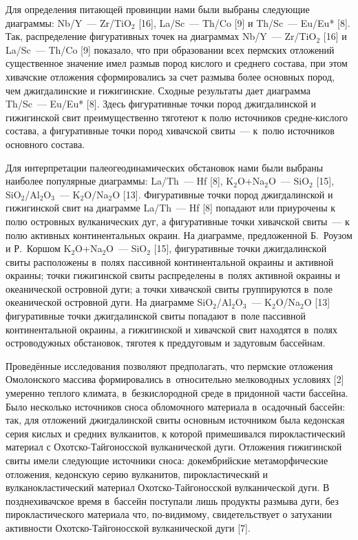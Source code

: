 Для определения питающей провинции нами были выбраны следующие диаграммы: Nb/Y~--- Zr/TiO$_2$ [16], La/Sc~--- Th/Co [9] и Th/Sc~--- Eu/Eu* [8]. Так, распределение фигуративных точек на диаграммах Nb/Y~--- Zr/TiO$_2$ [16] и La/Sc~--- Th/Co [9] показало, что при образовании
всех пермских отложений существенное значение имел размыв пород кислого и среднего состава, при этом хивачские отложения сформировались за счет размыва более основных пород, чем джигдалинские и гижигинские. Сходные результаты дает диаграмма Th/Sc~--- Eu/Eu* [8]. Здесь фигуративные точки пород джигдалинской и гижигинской свит преимущественно тяготеют к полю источников средне-кислого состава, а фигуративные точки пород хивачской свиты~--- к~полю источников основного состава.

Для интерпретации палеогеодинамических обстановок нами были выбраны наиболее популярные диаграммы: La/Th~--- Hf [8], K$_2$O+Na$_2$O~--- SiO$_2$ [15], SiO$_2$/Al$_2$O$_3$~--- K$_2$O/Na$_2$O [13]. Фигуративные точки пород джигдалинской и гижигинской свит на диаграмме La/Th~--- Hf [8] попадают или приурочены к полю островных вулканических дуг, а фигуративные точки хивачской свиты~--- к полю активных континентальных окраин. На диаграмме, предложенной Б.~Роузом и Р.~Коршом K$_2$O+Na$_2$O~--- SiO$_2$ [15], фигуративные точки джигдалинской свиты расположены в~полях пассивной континентальной окраины и активной окраины; точки гижигинской свиты распределены в~полях активной окраины и океанической островной дуги; а точки хивачской свиты группируются в~поле океанической островной дуги. На диаграмме SiO$_2$/Al$_2$O$_3$~--- K$_2$O/Na$_2$O [13] фигуративные точки джигдалинской свиты попадают в~поле пассивной континентальной окраины, а гижигинской и хивачской свит находятся в~полях островодужных обстановок, тяготея к преддуговым и задуговым бассейнам.

Проведённые исследования позволяют предполагать, что пермские отложения Омолонского массива формировались в~относительно мелководных условиях [2] умеренно теплого климата, в~безкислородной среде в придонной части
бассейна. Было несколько источников сноса обломочного материала в~осадочный бассейн: так, для отложений джигдалинской свиты основным источником была кедонская серия кислых и средних вулканитов, к которой примешивался пирокластический материал с Охотско-Тайгоносской вулканической дуги. Отложения гижигинской свиты имели следующие источники сноса: докембрийские метаморфические отложения, кедонскую серию вулканитов, пирокластический и вулканокластический материал Охотско-Тайгоносской вулканической дуги. В позднехивачское время в~бассейн поступали лишь продукты размыва дуги, без пирокластического материала что, по-видимому, свидетельствует о затухании активности Охотско-Тайгоносской вулканической дуги [7].

